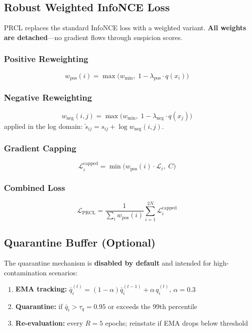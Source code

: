\documentclass[11pt,a4paper]{article}
\begin{document}
\subsection{Robust Weighted InfoNCE Loss}

PRCL replaces the standard InfoNCE loss with a weighted variant.  \textbf{All
weights are detached}---no gradient flows through suspicion scores.

\subsubsection{Positive Reweighting}
\begin{equation}
  w_{\text{pos}}(i)=\max\!\bigl(w_{\min},\;1-\lambda_{\text{pos}}\cdot q(x_i)\bigr)
  \label{eq:wpos}
\end{equation}

\subsubsection{Negative Reweighting}
\begin{equation}
  w_{\text{neg}}(i,j)=\max\!\bigl(w_{\min},\;1-\lambda_{\text{neg}}\cdot q(x_j)\bigr)
  \label{eq:wneg}
\end{equation}
applied in the log domain: $\tilde{s}_{ij}=s_{ij}+\log w_{\text{neg}}(i,j)$.

\subsubsection{Gradient Capping}
\begin{equation}
  \mathcal{L}_i^{\text{capped}}=\min\!\bigl(w_{\text{pos}}(i)\cdot\mathcal{L}_i,\;C\bigr)
  \label{eq:gradcap}
\end{equation}

\subsubsection{Combined Loss}
\begin{equation}
  \mathcal{L}_{\text{PRCL}}
  = \frac{1}{\sum_i w_{\text{pos}}(i)}
    \sum_{i=1}^{2N}\mathcal{L}_i^{\text{capped}}
  \label{eq:prcl_loss}
\end{equation}

\subsection{Quarantine Buffer (Optional)}

The quarantine mechanism is \textbf{disabled by default} and intended for
high-contamination scenarios:
\begin{enumerate}[nosep]
  \item \textbf{EMA tracking:}
    $\bar{q}_i^{(t)}=(1-\alpha)\bar{q}_i^{(t-1)}+\alpha\,q_i^{(t)}$,
    $\alpha=0.3$
  \item \textbf{Quarantine:} if $\bar{q}_i>\tau_q=0.95$ or exceeds the 99th
    percentile
  \item \textbf{Re-evaluation:} every $R=5$ epochs; reinstate if EMA drops
    below threshold
\end{enumerate}
\end{document}
